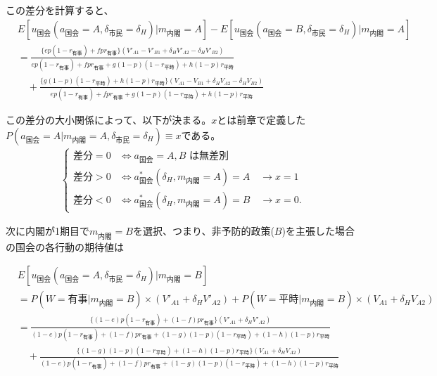\documentclass[main.tex]{subfiles}
\begin{document}
\bigskip
この差分を計算すると、
\begin{align*}
    & E[u_{国会}(a_{国会}=A, \delta_{市民}=\delta_H) | m_{内閣} = A  ] - E[u_{国会}(a_{国会}=B, \delta_{市民}=\delta_H) | m_{内閣} = A  ]\\[1em]
    &= \frac{ \{ep(1-r_{有事}) +  fpr_{有事}\}(V'_{A1} -V'_{B1} + \delta_H V'_{A2} - \delta_H V'_{B2})  }{ ep(1-r_{有事}) + fpr_{有事} + g(1-p)(1-r_{平時}) + h(1-p)r_{平時} }\\[1em]
    &\quad + \frac{ \{g(1-p)(1-r_{平時}) + h(1-p)r_{平時}\}(V_{A1} - V_{B1} + \delta_H V_{A2} - \delta_H V_{B2} ) }{ ep(1-r_{有事}) + fpr_{有事} + g(1-p)(1-r_{平時}) + h(1-p)r_{平時} }
\end{align*}

\bigskip
この差分の大小関係によって、以下が決まる。$x$とは前章で定義した\\
$P(a_{国会} = A| m_{内閣} = A, \delta_{市民} = \delta_H ) \equiv x$である。
\begin{align*}
    \begin{cases}
         \text{差分} = 0 &\Leftrightarrow \text{$a_{\text{国会}} = A, B$ は無差別} \\
         \text{差分} > 0 &\Leftrightarrow a^*_{\text{国会}}(\delta_H, m_{\text{内閣}} = A) = A \quad\rightarrow x = 1 \\
         \text{差分} < 0 &\Leftrightarrow a^*_{\text{国会}}(\delta_H, m_{\text{内閣}} = A) = B \quad\rightarrow x = 0.
    \end{cases}
\end{align*}





\bigskip
次に内閣が1期目で$m_{内閣}=B$を選択、つまり、非予防的政策($B$)を主張した場合の国会の各行動の期待値は

\begin{align*}
    & E[u_{国会}(a_{国会}=A, \delta_{市民}=\delta_H) | m_{内閣} = B  ]\\[0.5em]
    &= P(W=有事 | m_{内閣}=B) × (V'_{A1} + \delta_H V'_{A2}) + P(W=平時 | m_{内閣}=B) × (V_{A1} + \delta_H V_{A2})\\[0.5em]
    &= \frac{ \{(1-e)p(1-r_{有事}) +  (1-f)pr_{有事}\}(V'_{A1} + \delta_H V'_{A2}) }{ (1-e)p(1-r_{有事}) + (1-f)pr_{有事} + (1-g)(1-p)(1-r_{平時}) + (1-h)(1-p)r_{平時} }\\[1em]
    &\quad + \frac{ \{(1-g)(1-p)(1-r_{平時}) + (1-h)(1-p)r_{平時}\}(V_{A1} + \delta_H V_{A2}) }{ (1-e)p(1-r_{有事}) + (1-f)pr_{有事} + (1-g)(1-p)(1-r_{平時}) + (1-h)(1-p)r_{平時} }
\end{align*}
\end{document}

